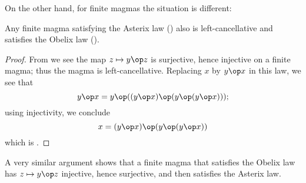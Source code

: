 On the other hand, for finite magmas the situation is different:

\begin{proposition}\label{asterix-obelix-finite}  Any finite magma satisfying the Asterix law () also is left-cancellative and satisfies the Obelix law ().
\end{proposition}

\begin{proof}  From  we see the map $z \mapsto y \op z$ is surjective, hence injective on a finite magma; thus the magma is left-cancellative.  Replacing $x$ by $y \op x$ in this law, we see that
$$ y \op x = y \op ((y\op x) \op (y \op (y \op x)));$$
using injectivity, we conclude
$$ x = (y\op x) \op (y \op (y \op x))$$
which is .
\end{proof}

A very similar argument shows that a finite magma that satisfies the Obelix law has $z \mapsto y \op z$ injective, hence surjective, and then satisfies the Asterix law.

